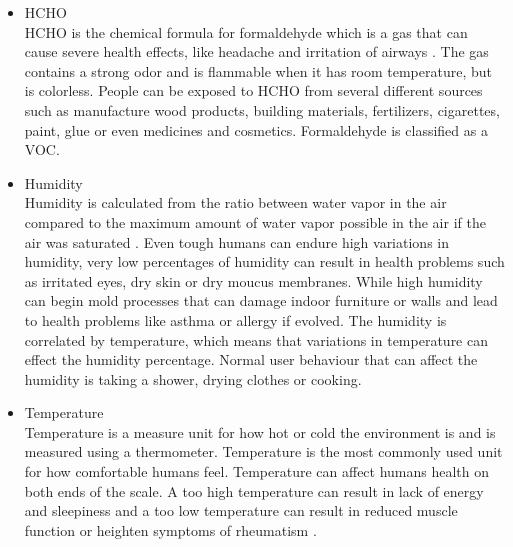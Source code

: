 \begin{itemize}
     \item HCHO\\
        HCHO is the chemical formula for formaldehyde which is a gas that can cause severe health effects, like headache and irritation of airways \cite{HCHO}. The gas contains a strong odor and is flammable when it has room temperature, but is colorless. People can be exposed to HCHO from several different sources such as manufacture wood products, building materials, fertilizers, cigarettes, paint, glue or even medicines and cosmetics. Formaldehyde is classified as a VOC.\\
    \item Humidity\\
        Humidity is calculated from the ratio between water vapor in the air compared to the maximum amount of water vapor possible in the air if the air was saturated \cite{RecommendedIAQ}. Even tough humans can endure high variations in humidity, very low percentages of humidity can result in health problems such as irritated eyes, dry skin or dry moucus membranes. While high humidity can begin mold processes that can damage indoor furniture or walls and lead to health problems like asthma or allergy if evolved. The humidity is correlated by temperature, which means that variations in temperature can effect the humidity percentage. Normal user behaviour that can affect the humidity is taking a shower, drying clothes or cooking. \\
    \item Temperature\\
        Temperature is a measure unit for how hot or cold the environment is and is measured using a thermometer. Temperature is the most commonly used unit for how comfortable humans feel. Temperature can affect humans health on both ends of the scale. A too high temperature can result in lack of energy and sleepiness and a too low temperature can result in reduced muscle function or heighten symptoms of rheumatism \cite{Temp}.\\
\end{itemize}

